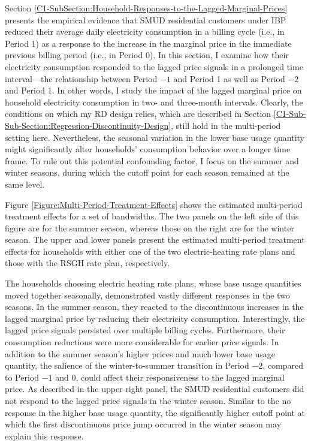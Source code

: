 Section \ref{C1-SubSection:Household-Responses-to-the-Lagged-Marginal-Prices} presents the empirical evidence that SMUD residential customers under IBP reduced their average daily electricity consumption in a billing cycle (i.e., in Period 1) as a response to the increase in the marginal price in the immediate previous billing period (i.e., in Period 0). In this section, I examine how their electricity consumption responded to the lagged price signals in a prolonged time interval---the relationship between Period $-1$ and Period 1 as well as Period $-2$ and Period 1. In other words, I study the impact of the lagged marginal price on household electricity consumption in two- and three-month intervals. Clearly, the conditions on which my RD design relies, which are described in Section \ref{C1-Sub-Sub-Section:Regression-Discontinuity-Design}, still hold in the multi-period setting here. Nevertheless, the seasonal variation in the lower base usage quantity might significantly alter households' consumption behavior over a longer time frame. To rule out this potential confounding factor, I focus on the summer and winter seasons, during which the cutoff point for each season remained at the same level. 

Figure \ref{Figure:Multi-Period-Treatment-Effects} shows the estimated multi-period treatment effects for a set of bandwidths. The two panels on the left side of this figure are for the summer season, whereas those on the right are for the winter season. The upper and lower panels present the estimated multi-period treatment effects for households with either one of the two electric-heating rate plans and those with the RSGH rate plan, respectively. 

The households choosing electric heating rate plans, whose base usage quantities moved together seasonally, demonstrated vastly different responses in the two seasons. In the summer season, they reacted to the discontinuous increases in the lagged marginal price by reducing their electricity consumption. Interestingly, the lagged price signals persisted over multiple billing cycles. Furthermore, their consumption reductions were more considerable for earlier price signals. In addition to the summer season's higher prices and much lower base usage quantity, the salience of the winter-to-summer transition in Period $-2$, compared to Period $-1$ and 0, could affect their responsiveness to the lagged marginal price. As described in the upper right panel, the SMUD residential customers did not respond to the lagged price signals in the winter season. Similar to the no response in the higher base usage quantity, the significantly higher cutoff point at which the first discontinuous price jump occurred in the winter season may explain this response. 

